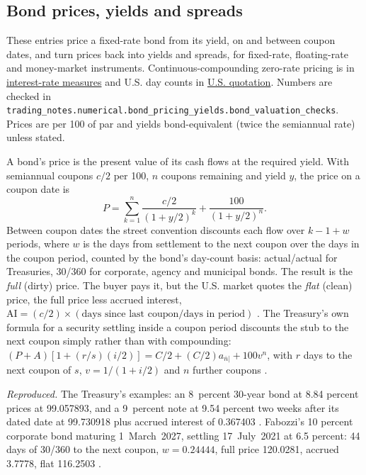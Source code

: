 \subsection{Bond prices, yields and spreads}

These entries price a fixed-rate bond from its yield, on and between coupon dates, and turn prices back into yields and spreads, for fixed-rate, floating-rate and money-market instruments. Continuous-compounding zero-rate pricing is in \hyperref[def:interest-rate-measures]{interest-rate measures} and U.S. day counts in \hyperref[conv:us-rate-quotation]{U.S. quotation}. Numbers are checked in \nolinkurl{trading_notes.numerical.bond_pricing_yields.bond_valuation_checks}. Prices are per 100 of par and yields bond-equivalent (twice the semiannual rate) unless stated.

\begin{qfmethod}\label{meth:bond-price-from-yield}
 A bond's price is the present value of its cash flows at the required yield. With semiannual coupons $c/2$ per 100, $n$ coupons remaining and yield $y$, the price on a coupon date is
\[ P=\sum_{k=1}^{n}\frac{c/2}{(1+y/2)^k}+\frac{100}{(1+y/2)^n}. \]
Between coupon dates the street convention discounts each flow over $k-1+w$ periods, where $w$ is the days from settlement to the next coupon over the days in the coupon period, counted by the bond's day-count basis: actual/actual for Treasuries, 30/360 for corporate, agency and municipal bonds. The result is the \emph{full} (dirty) price. The buyer pays it, but the U.S. market quotes the \emph{flat} (clean) price, the full price less accrued interest, $\text{AI}=(c/2)\times(\text{days since last coupon}/\text{days in period})$ \citep[chap.~4, pp.~65 and~72--76]{s7-fabozzifixed}. The Treasury's own formula for a security settling inside a coupon period discounts the stub to the next coupon simply rather than with compounding: $(P+A)[1+(r/s)(i/2)]=C/2+(C/2)a_{\overline n|}+100v^n$, with $r$ days to the next coupon of $s$, $v=1/(1+i/2)$ and $n$ further coupons \citep[sec.~II.D]{cfr-31-356-appendix-b}.

 \emph{Reproduced.} The Treasury's examples: an 8\textthreequarters\ percent 30-year bond at 8.84 percent prices at 99.057893, and a 9\textonehalf\ percent note at 9.54 percent two weeks after its dated date at 99.730918 plus accrued interest of 0.367403 \citep[secs.~II.A and~II.D]{cfr-31-356-appendix-b}. Fabozzi's 10 percent corporate bond maturing 1~March~2027, settling 17~July~2021 at 6.5 percent: 44 days of 30/360 to the next coupon, $w=0.24444$, full price 120.0281, accrued 3.7778, flat 116.2503 \citep[chap.~4, Exhibit~4-4, pp.~74--75]{s7-fabozzifixed}.


\end{qfmethod}
